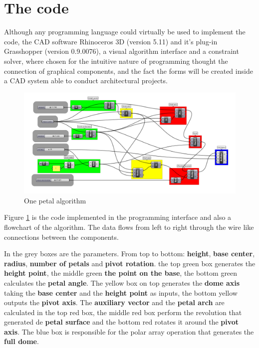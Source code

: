 \documentclass[preprint,12pt,3p]{elsarticle}
\begin{document}
\section{The code}
\label{code}

Although any programming language could virtually be used to implement the code, the CAD software Rhinoceros 3D (version 5.11) and it's plug-in Grasshopper (version 0.9.0076), a visual algorithm interface and a constraint solver, where chosen for the intuitive nature of programming thought the connection of graphical components, and the fact the forms will be created inside a CAD system able to conduct architectural projects.

\begin{figure}[!h]
\begin{center}
\includegraphics[width=0.95
\textwidth]{alg01.png}
\caption{One petal algorithm}
\label{figura:alg01}
\end{center}
\end{figure}

Figure \ref{figura:alg01} is the code implemented in the programming interface and also a flowchart of the algorithm. The data flows from left to right through the wire like connections between the components.

In the grey boxes are the parameters. From top to bottom: \textbf{height}, \textbf{base center},\textbf{ radius}, \textbf{number of petals} and \textbf{pivot rotation}. the top green box generates the \textbf{height point}, the middle green \textbf{the point on the base}, the bottom green calculates the \textbf{petal angle}. The yellow box on top generates the \textbf{dome axis} taking the \textbf{base center} and the \textbf{height point} as inputs, the bottom yellow outputs the \textbf{pivot axis}. The \textbf{auxiliary vector} and the \textbf{petal arch} are calculated in the top red box, the middle red box perform the revolution that generated de \textbf{petal surface} and the bottom red rotates it around the \textbf{pivot axis}. The blue box is responsible for the polar array operation that generates the \textbf{full dome}.
\end{document}
